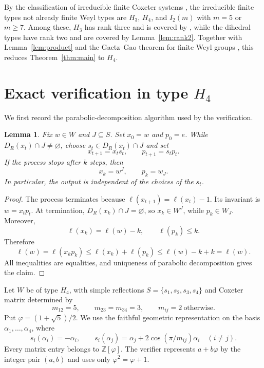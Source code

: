 \documentclass[11pt]{amsart}
\newtheorem{lemma}[theorem]{Lemma}
\newcommand{\DR}{D_R}
\begin{document}
By the classification of irreducible finite Coxeter systems
\cite{Humphreys}, the irreducible finite types not already finite Weyl
types are $H_3$, $H_4$, and $I_2(m)$ with $m=5$ or $m\geq7$. Among these,
$H_3$ has rank three and is covered by \cite[Theorem~3.15]{GaetzGao}, while
the dihedral types have rank two and are covered by
Lemma~\ref{lem:rank2}. Together with Lemma~\ref{lem:product} and the
Gaetz--Gao theorem for finite Weyl groups \cite[Theorem~1.2]{GaetzGao},
this reduces Theorem~\ref{thm:main} to $H_4$.

\section{Exact verification in type \texorpdfstring{$H_4$}{H4}}
\label{sec:h4}

We first record the parabolic-decomposition algorithm used by the
verification.

\begin{lemma}\label{lem:stripping}
Fix $w\in W$ and $J\subseteq S$. Set $x_0=w$ and $p_0=e$. While
$\DR(x_t)\cap J\neq\varnothing$, choose $s_t\in\DR(x_t)\cap J$ and set
\[
  x_{t+1}=x_ts_t,
  \qquad
  p_{t+1}=s_tp_t.
\]
If the process stops after $k$ steps, then
\[
  x_k=w^J,
  \qquad
  p_k=w_J.
\]
In particular, the output is independent of the choices of the $s_t$.
\end{lemma}

\begin{proof}
The process terminates because $\ell(x_{t+1})=\ell(x_t)-1$. Its invariant
is $w=x_tp_t$. At termination, $\DR(x_k)\cap J=\varnothing$, so
$x_k\in W^J$, while $p_k\in W_J$. Moreover,
\[
  \ell(x_k)=\ell(w)-k,
  \qquad
  \ell(p_k)\leq k.
\]
Therefore
\[
  \ell(w)=\ell(x_kp_k)
  \leq \ell(x_k)+\ell(p_k)
  \leq \ell(w)-k+k
  =\ell(w).
\]
All inequalities are equalities, and uniqueness of parabolic decomposition
gives the claim.
\end{proof}

Let $W$ be of type $H_4$, with simple reflections
$S=\{s_1,s_2,s_3,s_4\}$ and Coxeter matrix determined by
\[
  m_{12}=5,
  \qquad
  m_{23}=m_{34}=3,
  \qquad
  m_{ij}=2\ \text{otherwise}.
\]
Put $\varphi=(1+\sqrt5)/2$. We use the faithful geometric representation
\cite{Humphreys} on the basis
$\alpha_1,\ldots,\alpha_4$, where
\[
  s_i(\alpha_i)=-\alpha_i,
  \qquad
  s_i(\alpha_j)
  =\alpha_j+2\cos(\pi/m_{ij})\alpha_i
  \quad(i\neq j).
\]
Every matrix entry belongs to $\mathbb Z[\varphi]$. The verifier represents
$a+b\varphi$ by the integer pair $(a,b)$ and uses only
$\varphi^2=\varphi+1$.
\end{document}

